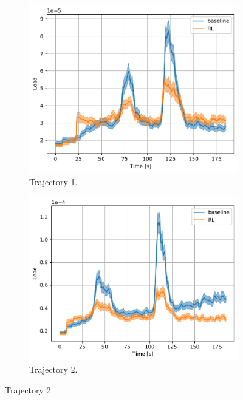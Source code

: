 \documentclass[english, 12pt, a4paper, elec, utf8, a-1b, online]{aaltothesis}
\begin{document}
\begin{figure}[htb]
    \centering
    \begin{subfigure}[b]{0.45\textwidth}
        \centering
        \includegraphics[width=\linewidth]{figures/benchmark/Simulations/tracking_load_0.pdf}
        \caption{Trajectory 1.}
        \label{fig:TL_T1}
    \end{subfigure}
    \hfill
    \begin{subfigure}[b]{0.45\textwidth}
        \centering
        \includegraphics[width=\linewidth]{figures/benchmark/Simulations/tracking_load_1.pdf}
        \caption{Trajectory 2.}
        \label{fig:TL_T2}

\end{subfigure}
\end{figure}
\end{document}
